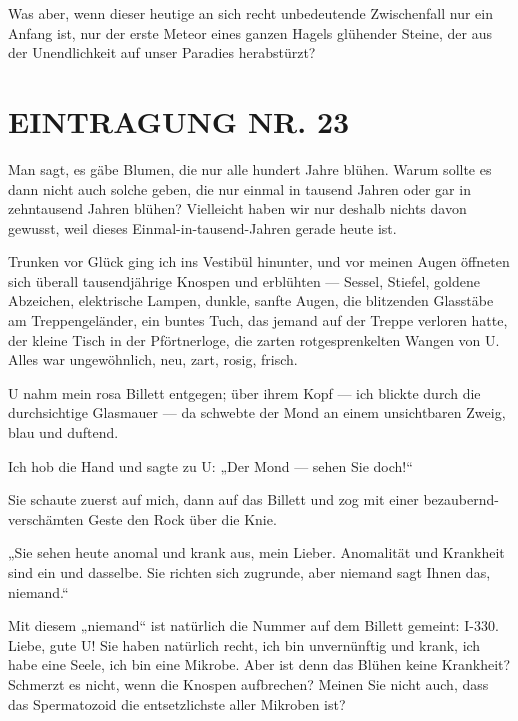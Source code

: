 Was aber, wenn dieser heutige an sich recht unbedeutende
Zwischenfall nur ein Anfang ist, nur der erste Meteor eines ganzen
Hagels glühender Steine, der aus der Unendlichkeit auf unser
Paradies herabstürzt?

\section{EINTRAGUNG NR. 23}

Man sagt, es gäbe Blumen, die nur alle hundert Jahre blühen. Warum
sollte es dann nicht auch solche geben, die nur einmal in tausend
Jahren oder gar in zehntausend Jahren blühen? Vielleicht haben wir
nur deshalb nichts davon gewusst, weil dieses
Einmal-in-tausend-Jahren gerade heute ist.

Trunken vor Glück ging ich ins Vestibül hinunter, und vor meinen
Augen öffneten sich überall tausendjährige Knospen und erblühten —
Sessel, Stiefel, goldene Abzeichen, elektrische Lampen, dunkle,
sanfte Augen, die blitzenden Glasstäbe am Treppengeländer, ein
buntes Tuch, das jemand auf der Treppe verloren hatte, der kleine
Tisch in der Pförtnerloge, die zarten rotgesprenkelten Wangen von
U. Alles war ungewöhnlich, neu, zart, rosig, frisch.

U nahm mein rosa Billett entgegen; über ihrem Kopf — ich blickte
durch die durchsichtige Glasmauer — da schwebte der Mond an einem
unsichtbaren Zweig, blau und duftend.

Ich hob die Hand und sagte zu U: „Der Mond — sehen Sie doch!“

Sie schaute zuerst auf mich, dann auf das Billett und zog mit einer
bezaubernd-verschämten Geste den Rock über die Knie.

„Sie sehen heute anomal und krank aus, mein Lieber. Anomalität und
Krankheit sind ein und dasselbe. Sie richten sich zugrunde, aber
niemand sagt Ihnen das, niemand.“

Mit diesem „niemand“ ist natürlich die Nummer auf dem Billett
gemeint: I-330. Liebe, gute U! Sie haben natürlich recht, ich bin
unvernünftig und krank, ich habe eine Seele, ich bin eine Mikrobe.
Aber ist denn das Blühen keine Krankheit? Schmerzt es nicht, wenn
die Knospen aufbrechen? Meinen Sie nicht auch, dass das
Spermatozoid die entsetzlichste aller Mikroben ist?

